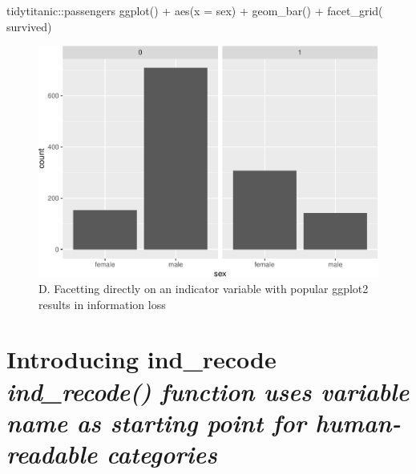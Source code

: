 \begin{Schunk}
\begin{Sinput}
tidytitanic::passengers %
ggplot() + 
  aes(x = sex) + 
  geom_bar() + 
  facet_grid(~ survived)
\end{Sinput}
\begin{figure}
\includegraphics[width=0.69\linewidth]{r_journal_files/figure-latex/unnamed-chunk-8-1} \caption[D]{D. Facetting directly on an indicator variable with popular ggplot2 results in information loss}\label{fig:unnamed-chunk-8}
\end{figure}
\end{Schunk}

\hypertarget{introducing-ind_recode-ind_recode-function-uses-variable-name-as-starting-point-for-human-readable-categories}{%
\section{\texorpdfstring{Introducing ind\_recode \emph{ind\_recode()
function uses variable name as starting point for human-readable
categories}}{Introducing ind\_recode ind\_recode() function uses variable name as starting point for human-readable categories}}\label{introducing-ind_recode-ind_recode-function-uses-variable-name-as-starting-point-for-human-readable-categories}}

